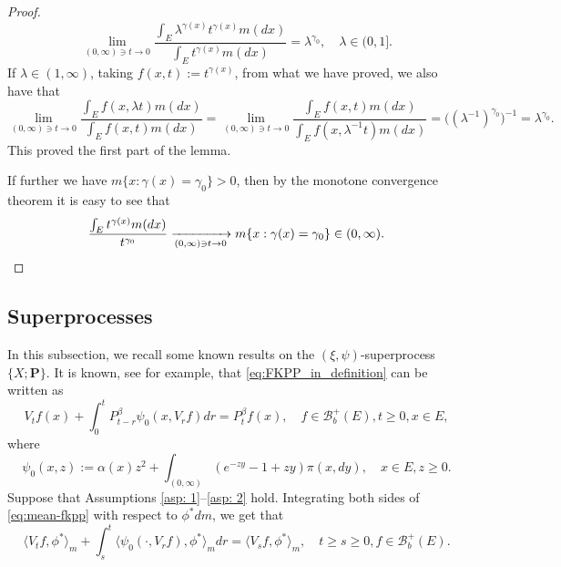 \documentclass[12pt, a4paper]{amsart}
\theoremstyle{definition}
\numberwithin{equation}{section}
\begin{document}
\begin{proof}
\begin{equation}
	\lim_{(0,\infty) \ni t\to 0}\frac{\int_E \lambda^{\gamma(x)} t^{\gamma(x)} m(dx)}{\int_E t^{\gamma(x)} m(dx)}
	= \lambda ^{\gamma_0},	
	\quad \lambda \in (0,1]. %
\end{equation}
	If $\lambda \in (1,\infty)$, taking $f(x, t):= t^{\gamma(x)}$, from what we have proved, we also have that
\begin{equation}
	\lim_{(0,\infty)\ni t\to 0}\frac{\int_E f(x,\lambda t)m(dx)}{\int_E f(x, t)m(dx)}
	= \lim_{(0,\infty)\ni t\to 0}\frac{\int_E f(x,t)m(dx)}{\int_E f(x, \lambda^{-1} t)m(dx)}
	= \big((\lambda^{-1})^{\gamma_0} \big)^{-1}
	= \lambda ^{\gamma_0}.%
\end{equation}
	This proved the first part of the lemma.
	
	If further we have $m\{x:\gamma(x) = \gamma_0\}>0$, then by the monotone convergence theorem  it is easy to see that
\begin{equation}
	\frac{\int_E t^{\gamma(x)} m(dx)}{t^{\gamma_0}}
	\xrightarrow[(0,\infty)\ni t\to 0]{} m\{x:\gamma(x) = 
	\gamma_0\}\in (0,\infty).
	\qedhere
\end{equation}
\end{proof}

\subsection{Superprocesses} \label{sec: Superprocesses}
	In this subsection, we recall some known results on the $(\xi, \psi)$-superprocess $\{X; \mathbf P\}$.
	It is known, see \cite[Theorem 2.23]{Li2011Measure-valued} for example, that \eqref{eq:FKPP_in_definition} can be written as
\begin{equation}\label{eq:mean-fkpp}
	V_t f(x) + \int_0^t P^\beta_{t-r} \psi_0(x,V_r f) dr
	= P^\beta_t f(x),
	\quad f \in \mathscr B^+_b(E), t \geq 0,x \in E,
\end{equation}
	where
\begin{equation}
	\psi_0(x,z)
	:= \alpha(x) z^2 + \int_{(0,\infty)} (e^{-z y} - 1 + z y) \pi(x,dy),
	\quad x \in E,z \geq 0.
\end{equation}
    Suppose that Assumptions \ref{asp: 1}--\ref{asp: 2} hold.
    Integrating both sides of \eqref{eq:mean-fkpp}  with respect to  $\phi^*dm$, we get that
\begin{equation}\label{eq:langleVtfphiranglem_equation}
	\langle V_tf,\phi^*\rangle_m + \int_s^t \langle \psi_0(\cdot ,V_r f) , \phi^*\rangle_mdr
	= \langle V_sf,\phi^*\rangle_m,
	\quad t\geq s\geq 0, f\in \mathscr B^+_b(E).
\end{equation}
\end{document}
